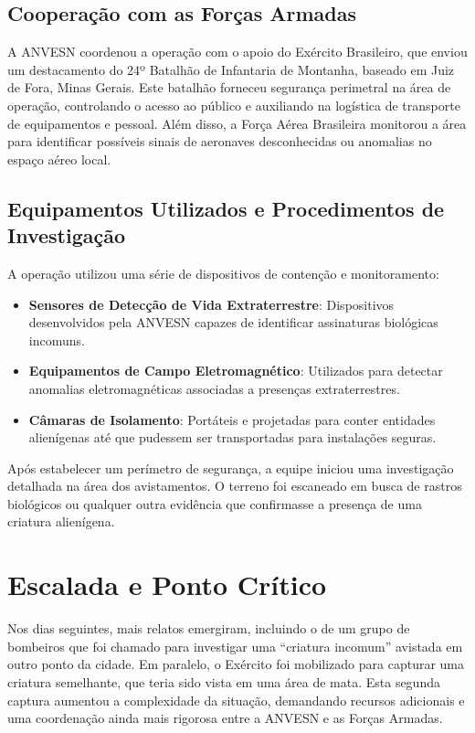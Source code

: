 \subsection{Cooperação com as Forças Armadas}
A ANVESN coordenou a operação com o apoio do Exército Brasileiro, que enviou um destacamento do 24º Batalhão de Infantaria de Montanha, baseado em Juiz de Fora, Minas Gerais. Este batalhão forneceu segurança perimetral na área de operação, controlando o acesso ao público e auxiliando na logística de transporte de equipamentos e pessoal. Além disso, a Força Aérea Brasileira monitorou a área para identificar possíveis sinais de aeronaves desconhecidas ou anomalias no espaço aéreo local.

\subsection{Equipamentos Utilizados e Procedimentos de Investigação}
A operação utilizou uma série de dispositivos de contenção e monitoramento:

\begin{itemize}
    \item \textbf{Sensores de Detecção de Vida Extraterrestre}: Dispositivos desenvolvidos pela ANVESN capazes de identificar assinaturas biológicas incomuns.
    \item \textbf{Equipamentos de Campo Eletromagnético}: Utilizados para detectar anomalias eletromagnéticas associadas a presenças extraterrestres.
    \item \textbf{Câmaras de Isolamento}: Portáteis e projetadas para conter entidades alienígenas até que pudessem ser transportadas para instalações seguras.
\end{itemize}

Após estabelecer um perímetro de segurança, a equipe iniciou uma investigação detalhada na área dos avistamentos. O terreno foi escaneado em busca de rastros biológicos ou qualquer outra evidência que confirmasse a presença de uma criatura alienígena.

\section{ Escalada e Ponto Crítico}

Nos dias seguintes, mais relatos emergiram, incluindo o de um grupo de bombeiros que foi chamado para investigar uma “criatura incomum” avistada em outro ponto da cidade. Em paralelo, o Exército foi mobilizado para capturar uma criatura semelhante, que teria sido vista em uma área de mata. Esta segunda captura aumentou a complexidade da situação, demandando recursos adicionais e uma coordenação ainda mais rigorosa entre a ANVESN e as Forças Armadas.

